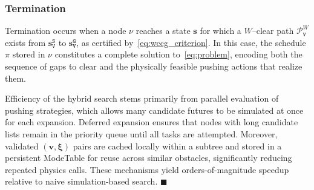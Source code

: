 \subsubsection{Termination}
Termination occurs when a node $\nu$ reaches a state $\mathbf{s}$ for which a
$W$--clear path $\mathcal{P}^W_\texttt{V}$ exists from
$\mathbf{s}_\texttt{V}^{\texttt{S}}$ to $\mathbf{s}_\texttt{V}^{\texttt{G}}$,
as certified by~\eqref{eq:wccg_criterion}. In this case, the schedule $\pi$
stored in $\nu$ constitutes a complete solution to~\eqref{eq:problem}, encoding
both the sequence of gaps to clear and the physically feasible pushing actions
that realize them.

\begin{remark}\label{remark:simloop}
Efficiency of the hybrid search stems primarily from parallel evaluation of
pushing strategies, which allows many candidate futures to be simulated at once
for each expansion. Deferred expansion ensures that nodes with long candidate
lists remain in the priority queue until all tasks are attempted.
Moreover, validated $(\mathbf{v},\boldsymbol{\xi})$ pairs
are cached locally within a subtree and stored in a persistent ModeTable for
reuse across similar obstacles, significantly reducing repeated physics calls.
These mechanisms yield orders-of-magnitude speedup relative to naive
simulation-based search. \hfill$\blacksquare$
\end{remark}
